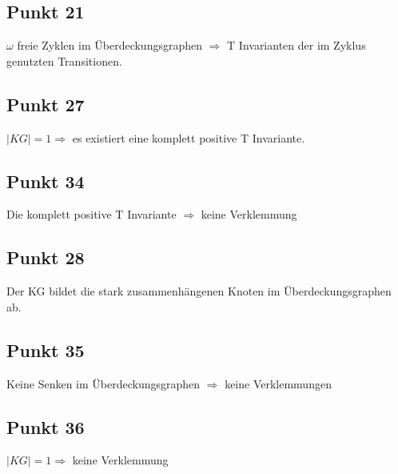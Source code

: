 \documentclass[10pt]{scrartcl}
\begin{document}
				\subsection{Punkt 21}
				$\omega$ freie Zyklen im Überdeckungsgraphen $\Longrightarrow$ T Invarianten der im Zyklus genutzten Transitionen.
				
				\subsection{Punkt 27}
				$|KG| = 1 \Longrightarrow $ es existiert eine komplett positive T Invariante.
				
				\subsection{Punkt 34}
				Die komplett positive T Invariante $\Longrightarrow$ keine Verklemmung
				
				\subsection{Punkt 28}
				Der KG bildet die stark zusammenhängenen Knoten im Überdeckungsgraphen ab.
				
				\subsection{Punkt 35}
				Keine Senken im Überdeckungsgraphen $\Longrightarrow$ keine Verklemmungen
				
				\subsection{Punkt 36}
				$|KG| = 1 \Longrightarrow $ keine Verklemmung 
\end{document}
